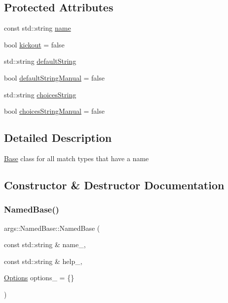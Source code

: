 \subsection*{Protected Attributes}
\begin{DoxyCompactItemize}
\item 
const std\+::string \hyperlink{classargs_1_1_named_base_a774cbec5dc864c48e84051c044cefa77}{name}
\item 
bool \hyperlink{classargs_1_1_named_base_a034ad347cb530cbf9e0e9ce1b67a66ba}{kickout} = false
\item 
std\+::string \hyperlink{classargs_1_1_named_base_a7460bf500a1873039fc741247a959ddc}{default\+String}
\item 
bool \hyperlink{classargs_1_1_named_base_a2bfe3539152114a52a4a8089920eea59}{default\+String\+Manual} = false
\item 
std\+::string \hyperlink{classargs_1_1_named_base_a2e1624c744d671916b0c943f8fbad962}{choices\+String}
\item 
bool \hyperlink{classargs_1_1_named_base_afc180b62e1f2d9c194354b163f3410b6}{choices\+String\+Manual} = false
\end{DoxyCompactItemize}


\subsection{Detailed Description}
\hyperlink{classargs_1_1_base}{Base} class for all match types that have a name 

\subsection{Constructor \& Destructor Documentation}
\mbox{\label{classargs_1_1_named_base_a09810fc700d6ab589e04f3414edb4f4f}} 
\subsubsection{\texorpdfstring{Named\+Base()}{NamedBase()}}
{\footnotesize\ttfamily args\+::\+Named\+Base\+::\+Named\+Base (\begin{DoxyParamCaption}\item[{const std\+::string \&}]{name\+\_\+,  }\item[{const std\+::string \&}]{help\+\_\+,  }\item[{\hyperlink{namespaceargs_aa530c0f95194aa275f49a5f299ac9e77}{Options}}]{options\+\_\+ = {\ttfamily \{\}} }\end{DoxyParamCaption})\hspace{0.3cm}{\ttfamily [inline]}}


